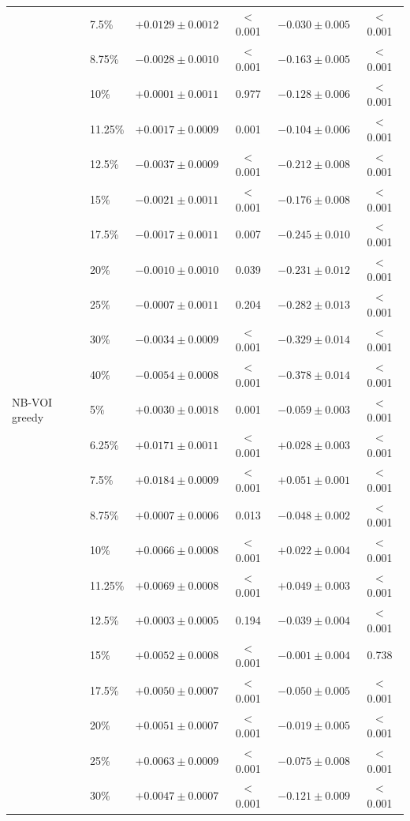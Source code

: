 \begin{tabular}{llcccc}
 & 7.5\% & $+0.0129\pm0.0012$ & $<$0.001 & $-0.030\pm0.005$ & $<$0.001 \\
 & 8.75\% & $-0.0028\pm0.0010$ & $<$0.001 & $-0.163\pm0.005$ & $<$0.001 \\
 & 10\% & $+0.0001\pm0.0011$ & 0.977 & $-0.128\pm0.006$ & $<$0.001 \\
 & 11.25\% & $+0.0017\pm0.0009$ & 0.001 & $-0.104\pm0.006$ & $<$0.001 \\
 & 12.5\% & $-0.0037\pm0.0009$ & $<$0.001 & $-0.212\pm0.008$ & $<$0.001 \\
 & 15\% & $-0.0021\pm0.0011$ & $<$0.001 & $-0.176\pm0.008$ & $<$0.001 \\
 & 17.5\% & $-0.0017\pm0.0011$ & 0.007 & $-0.245\pm0.010$ & $<$0.001 \\
 & 20\% & $-0.0010\pm0.0010$ & 0.039 & $-0.231\pm0.012$ & $<$0.001 \\
 & 25\% & $-0.0007\pm0.0011$ & 0.204 & $-0.282\pm0.013$ & $<$0.001 \\
 & 30\% & $-0.0034\pm0.0009$ & $<$0.001 & $-0.329\pm0.014$ & $<$0.001 \\
 & 40\% & $-0.0054\pm0.0008$ & $<$0.001 & $-0.378\pm0.014$ & $<$0.001 \\
\midrule
NB-VOI greedy & 5\% & $+0.0030\pm0.0018$ & 0.001 & $-0.059\pm0.003$ & $<$0.001 \\
 & 6.25\% & $+0.0171\pm0.0011$ & $<$0.001 & $+0.028\pm0.003$ & $<$0.001 \\
 & 7.5\% & $+0.0184\pm0.0009$ & $<$0.001 & $+0.051\pm0.001$ & $<$0.001 \\
 & 8.75\% & $+0.0007\pm0.0006$ & 0.013 & $-0.048\pm0.002$ & $<$0.001 \\
 & 10\% & $+0.0066\pm0.0008$ & $<$0.001 & $+0.022\pm0.004$ & $<$0.001 \\
 & 11.25\% & $+0.0069\pm0.0008$ & $<$0.001 & $+0.049\pm0.003$ & $<$0.001 \\
 & 12.5\% & $+0.0003\pm0.0005$ & 0.194 & $-0.039\pm0.004$ & $<$0.001 \\
 & 15\% & $+0.0052\pm0.0008$ & $<$0.001 & $-0.001\pm0.004$ & 0.738 \\
 & 17.5\% & $+0.0050\pm0.0007$ & $<$0.001 & $-0.050\pm0.005$ & $<$0.001 \\
 & 20\% & $+0.0051\pm0.0007$ & $<$0.001 & $-0.019\pm0.005$ & $<$0.001 \\
 & 25\% & $+0.0063\pm0.0009$ & $<$0.001 & $-0.075\pm0.008$ & $<$0.001 \\
 & 30\% & $+0.0047\pm0.0007$ & $<$0.001 & $-0.121\pm0.009$ & $<$0.001 \\

\end{tabular}
